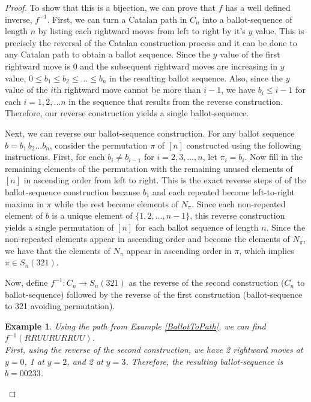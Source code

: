 \documentclass[12pt]{article}
\newtheorem{ex}{Example} %
\begin{document}
\begin{proof}
    To show that this is a bijection, we can prove that $f$ has a well defined inverse, $f^{-1}$. First, we can turn a Catalan path in $C_n$ into a ballot-sequence of length $n$ by listing each rightward moves from left to right by it's $y$ value. This is precisely the reversal of the Catalan construction process and it can be done to any Catalan path to obtain a ballot sequence. Since the $y$ value of the first rightward move is 0 and the subsequent rightward moves are increasing in $y$ value, $0\leq b_1\leq b_2\leq\dots\leq b_n$ in the resulting ballot sequence. Also, since the $y$ value of the $i$th rightward move cannot be more than $i-1$, we have $b_i\leq i-1$ for each $i=1,2,\dots n$ in the sequence that results from the reverse construction. Therefore, our reverse construction yields a single ballot-sequence.

    Next, we can reverse our ballot-sequence construction. For any ballot sequence $b=b_1\,b_2\dots b_n$, consider the permutation $\pi$ of $[n]$ constructed using the following instructions. First, for each $b_i\neq b_{i-1}$ for $i=2,3,\dots,n$, let $\pi_i=b_i$. Now fill in the remaining elements of the permutation with the remaining unused elements of $[n]$ in ascending order from left to right.
    This is the exact reverse steps of of the ballot-sequence construction because $b_1$ and each repeated become left-to-right maxima in $\pi$ while the rest become elements of $N_\pi$. Since each non-repeated element of $b$ is a unique element of $\{1,2,\dots,n-1\}$, this reverse construction yields a single permutation of $[n]$ for each ballot sequence of length $n$. Since the non-repeated elements appear in ascending order and become the elements of $N_\pi$, we have that the elements of $N_\pi$ appear in ascending order in $\pi$, which implies $\pi\in S_n(321)$.

    Now, define $f^{-1}:C_n\rightarrow S_n(321)$ as the reverse of the second construction ($C_n$ to ballot-sequence) followed by the reverse of the first construction (ballot-sequence to 321 avoiding permutation).

    \begin{ex}
        Using the path from Example \ref{BallotToPath}, we can find $f^{-1}(RRUURURRUU)$.\\
        
        First, using the reverse of the second construction, we have 2 rightward moves at $y=0$, 1 at $y=2$, and 2 at $y=3$. Therefore, the resulting ballot-sequence is $b=00233$.


\end{ex}
\end{proof}
\end{document}
